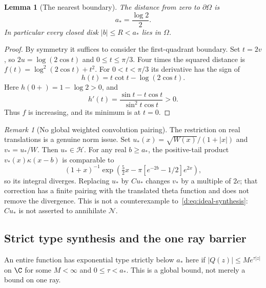 \documentclass[11pt,a4paper]{article}
\numberwithin{equation}{section}
\newtheorem{lemma}[theorem]{Lemma}
\theoremstyle{definition}\newtheorem{definition}[theorem]{Definition}
\theoremstyle{remark}\newtheorem{remark}[theorem]{Remark}
\newcommand{\Hh}{\mathcal H}\newcommand{\Hw}{\mathcal H}
\newcommand{\Nn}{\mathcal N}\newcommand{\Ii}{\mathcal I}\newcommand{\Zz}{\mathcal Z}
\begin{document}
\begin{lemma}[The nearest boundary]\label{d:lem:radius}
The distance from zero to $\partial\Omega$ is
\begin{equation}\label{d:eq:a-star}
 a_*=\frac{\log2}{2}.
\end{equation}
In particular every closed disk $|b|\le R<a_*$ lies in $\Omega$.
\end{lemma}
\begin{proof}
By symmetry it suffices to consider the first-quadrant boundary. Set $t=2v$, so $2u=\log(2\cos t)$ and $0\le t\le\pi/3$. Four times the squared distance is
$f(t)=\log^2(2\cos t)+t^2$. For $0<t<\pi/3$ its derivative has the sign of
\[
 h(t)=t\cot t-\log(2\cos t).
\]
Here $h(0+)=1-\log2>0$, and
\[
 h'(t)=\frac{\sin t-t\cos t}{\sin^2t\cos t}>0.
\]
Thus $f$ is increasing, and its minimum is at $t=0$.
\end{proof}

\begin{remark}[No global weighted convolution pairing]\label{d:rem:pairing}
The restriction on real translations is a genuine norm issue. Set
$u_*(x)=\sqrt{W(x)}/(1+|x|)$ and $v_*=u_*/W$. Then $u_*\in\Hh$. For any real $b\ge a_*$, the positive-tail product $v_*(x)\kappa(x-b)$ is comparable to
\[
 (1+x)^{-1}\exp\!\left(\tfrac52x-\pi[e^{-2b}-1/2]e^{2x}\right),
\]
so its integral diverges. Replacing $u_*$ by $Cu_*$ changes $v_*$ by a multiple of $2c$; that correction has a finite pairing with the translated theta function and does not remove the divergence. This is not a counterexample to~\eqref{d:eq:ideal-synthesis}: $Cu_*$ is not asserted to annihilate $\Nn$.
\end{remark}

\subsection{Strict type synthesis and the one ray barrier}\label{d:sec:type}

An entire function has exponential type strictly below $a_*$ here if
$|Q(z)|\le M e^{\tau|z|}$ on $\C$ for some $M<\infty$ and $0\le\tau<a_*$. This is a global bound, not merely a bound on one ray.
\end{document}
